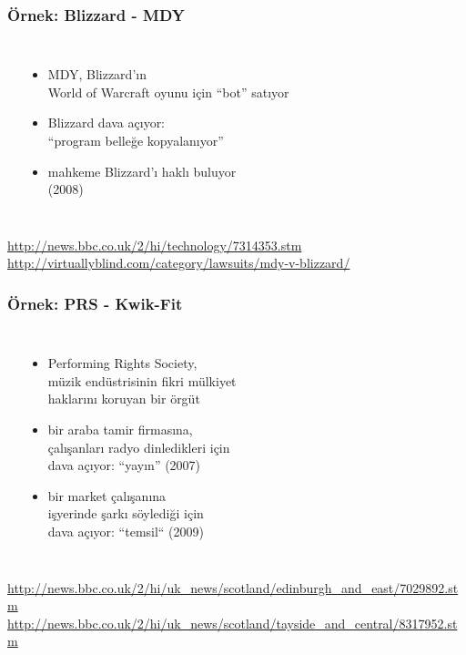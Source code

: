 \documentclass[dvipsnames]{beamer}
\theoremstyle{definition}
\theoremstyle{example}
\theoremstyle{plain}
\begin{document}
\begin{frame}
  \frametitle{Örnek: Blizzard - MDY}

  \begin{columns}
    \begin{center}
    \end{center}

    \begin{itemize}
      \item MDY, Blizzard'ın\\
        World of Warcraft oyunu için ``bot'' satıyor
      \item Blizzard dava açıyor:\\
        ``program belleğe kopyalanıyor''
      \item mahkeme Blizzard'ı haklı buluyor\\
        (2008)
    \end{itemize}
  \end{columns}

  \medskip
  \tiny{\url{http://news.bbc.co.uk/2/hi/technology/7314353.stm}}\\
  \tiny{\url{http://virtuallyblind.com/category/lawsuits/mdy-v-blizzard/}}\\
\end{frame}

\begin{frame}
  \frametitle{Örnek: PRS - Kwik-Fit}

  \begin{columns}
    \begin{center}
    \end{center}

    \begin{itemize}
      \item Performing Rights Society,\\
        müzik endüstrisinin fikri mülkiyet\\
        haklarını koruyan bir örgüt
      \item bir araba tamir firmasına,\\
        çalışanları radyo dinledikleri için\\
        dava açıyor: ``yayın'' (2007)
      \item bir market çalışanına\\
        işyerinde şarkı söylediği için\\
        dava açıyor: ``temsil`` (2009)
    \end{itemize}
  \end{columns}

  \medskip
  \tiny{\url{http://news.bbc.co.uk/2/hi/uk_news/scotland/edinburgh_and_east/7029892.stm}}\\
  \tiny{\url{http://news.bbc.co.uk/2/hi/uk_news/scotland/tayside_and_central/8317952.stm}}\\
\end{frame}
\end{document}

